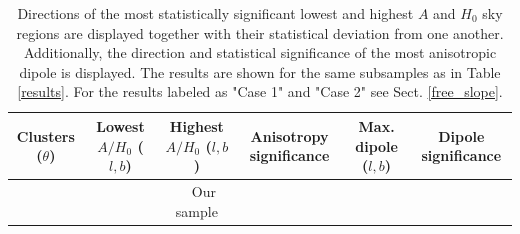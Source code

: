 \documentclass{aa}   %
\begin{document}
\begin{table}[hbtp]
\caption{\small{Directions of the most statistically significant lowest and highest $A$ and $H_0$ sky regions are displayed together with their statistical deviation from one another. Additionally, the direction and statistical significance of the most anisotropic dipole is displayed. The results are shown for the same subsamples as in Table \ref{results}. For the results labeled as "Case 1" and "Case 2"  see Sect. \ref{free_slope}.}}
\label{anisot_results}
\begin{center}
\renewcommand{\arraystretch}{1.1}
\small
\begin{tabular}{ c  c  c  c  c  c}
\hline \hline


Clusters ($\theta$)  & Lowest $A/H_0$ ($l,b$) & Highest $A/H_0$ ($l,b$) & Anisotropy significance & Max. dipole ($l,b$) & Dipole significance \\
\hline \hline
 & &\ \  Our sample & & & \\ \hline


\end{tabular}
\end{center}
\end{table}
\end{document}
